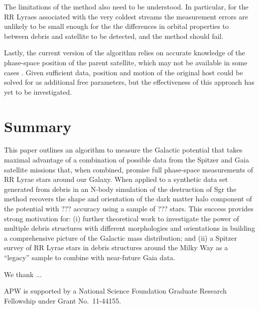 \documentclass[preprint]{aastex}
\begin{document}
The limitations of the method also need to be understood. In particular, for the RR Lyraes associated with  the very coldest streams \citep[e.g. the globular clusters Pal5
and GD1][]{odenkirchen02,koposov10} the measurement errors are unlikely to be small enough for the
the differences in orbital properties to between debris and satellite to be detected, and the method should fail.

Lastly, the current version of the algorithm relies on accurate knowledge of the phase-space position of the parent satellite, which may not be available in some cases
\citep[for example, for the Orphan Stream][]{belokurov07}. Given sufficient data, position and motion of the original host could be solved for as additional free parameters,
but the effectiveness of this approach has yet to be investigated.


\section{Summary}

This paper outlines an algorithm to measure the Galactic potential that takes maximal advantage of a combination of possible data from the Spitzer and Gaia satellite
missions that, when combined,  promise full phase-space measurements of RR Lyrae stars around our Galaxy.
When applied to a synthetic data set generated from debris in an N-body simulation of the destruction of Sgr the method recovers the shape and orientation of the dark
matter halo component of the potential with ??? accuracy using a sample of ??? stars.
This success provides strong motivation for: (i) further theoretical work to investigate the power of multiple debris structures with different morphologies and orientations in
building a comprehensive picture of the Galactic mass distribution; and (ii) a  Spitzer survey of RR Lyrae stars in debris structures around the Milky Way as a ``legacy''
sample to combine with near-future Gaia data.

\acknowledgments
We thank ...

APW is supported by a National Science Foundation Graduate Research Fellowship under Grant No.\ 11-44155.



\end{document}
